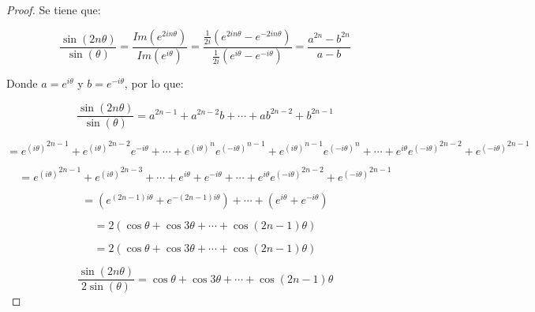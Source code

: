 \documentclass[11pt]{article}
\theoremstyle{Tema} \newtheorem{Tema}{Tema} %
\theoremstyle{Tema} \newtheorem{serie}{Serie}              %
\theoremstyle{Tema} \newtheorem{ejercicio}{Ejercicio}    %
\begin{document}
\begin{proof}
Se tiene que:

\begin{equation*}
\dfrac{\sin(2n\theta)}{\sin(\theta)}=\dfrac{Im(e^{2in\theta})}{Im(e^{i\theta})}=\dfrac{\frac{1}{2i}(e^{2in\theta}-e^{-2in\theta})}{\frac{1}{2i}(e^{i\theta}-e^{-i\theta})} = \dfrac{a^{2n}-b^{2n}}{a-b}
\end{equation*}
		
		
	Donde $ a = e^{i\theta}  $	y $ b=e^{-i\theta} $, por lo que:
	
	
	
	\begin{equation*}
	\dfrac{\sin(2n\theta)}{\sin(\theta)}= a^{2n-1}+a^{2n-2}b+\cdots+ab^{2n-2}+b^{2n-1}
	\end{equation*}
		
		
		\begin{equation*}
		= {e^{(i\theta)}}^{2n-1}+{e^{(i\theta)}}^{2n-2}{e^{-i\theta}}+\cdots+{e^{(i\theta)}}^{n}{e^{(-i\theta)}}^{n-1}+{e^{(i\theta)}}^{n-1}{e^{(-i\theta)}}^{n}+\cdots+{e^{i\theta}}{e^{(-i\theta)}}^{2n-2}+{e^{(-i\theta)}}^{2n-1}
		\end{equation*}
		
		
			\begin{equation*}
		= {e^{(i\theta)}}^{2n-1}+{e^{(i\theta)}}^{2n-3}+\cdots+e^{i\theta}+e^{-i\theta}+
		\cdots +{e^{i\theta}}{e^{(-i\theta)}}^{2n-2}+{e^{(-i\theta)}}^{2n-1}
		\end{equation*}
		
		
		
		\begin{equation*}
		= (e^{(2n-1)i\theta}+e^{-(2n-1)i\theta})+\cdots+(e^{i\theta}+e^{-i\theta})
		\end{equation*}
		
		
		
			
		\begin{equation*}
		= 2 (\cos \theta+\cos 3\theta+\cdots+\cos(2n-1)\theta)
		\end{equation*}
		
		\begin{equation*}
		= 2 (\cos \theta+\cos 3\theta+\cdots+\cos(2n-1)\theta)
		\end{equation*}
		
		\begin{equation*}
		\dfrac{\sin(2n\theta)}{2\sin(\theta)}=\cos \theta+\cos 3\theta+\cdots+\cos(2n-1)\theta
		\end{equation*}
		
		
		\end{proof}
\end{document}
